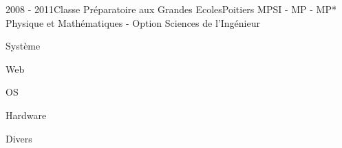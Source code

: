 \documentclass[a4paper]{genard-cv}
\begin{document}
\begin{body}
\begin{entry}
		\end{entry}
		\begin{entry}
			{2008 - 2011}{Classe Préparatoire aux Grandes Ecoles}{Poitiers}
			{MPSI - MP - MP*}
			Physique et Mathématiques - Option Sciences de l'Ingénieur
		\end{entry}

\end{body}

\begin{aside}

	\begin{about}
	\end{about}\noindent

	\skills
	
	\begin{skillgroup}{Système}
	\end{skillgroup}

	\begin{skillgroup}{Web}
	\end{skillgroup}

	\begin{skillgroup}{OS}
	\end{skillgroup}

  \begin{skillgroup}{Hardware}
  \end{skillgroup}

	\begin{skillgroup}{Divers}
	\end{skillgroup}
\end{aside}
\end{document}
